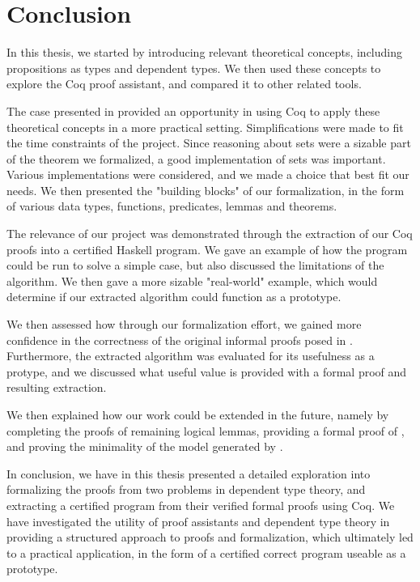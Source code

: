 \chapter{Conclusion}

In this thesis, we started by introducing relevant theoretical concepts,
including propositions as types and dependent types.
We then used these concepts to explore the Coq proof assistant,
and compared it to other related tools.

The case presented in 
provided an opportunity in using Coq to apply these theoretical concepts
in a more practical setting.
Simplifications were made to fit the time constraints of the project.
Since reasoning about sets were a sizable part of the theorem we formalized,
a good implementation of sets was important.
Various implementations were considered, and we made a choice that best fit our needs.
We then presented the "building blocks" of our formalization,
in the form of various data types, functions, predicates, lemmas and theorems.

The relevance of our project was demonstrated through the extraction
of our Coq proofs into a certified Haskell program.
We gave an example of how the program could be run to solve a simple case,
but also discussed the limitations of the algorithm.
We then gave a more sizable "real-world" example,
which would determine if our extracted algorithm could function as a prototype.

We then assessed how through our formalization effort,
we gained more confidence in the correctness of the original informal proofs posed in \cite{mbezem}.
Furthermore, the extracted algorithm was evaluated for its usefulness as a protype,
and we discussed what useful value is provided with a formal proof and resulting extraction.

We then explained how our work could be extended in the future,
namely by completing the proofs of remaining logical lemmas,
providing a formal proof of , and proving the minimality of the model generated by .

In conclusion, we have in this thesis presented a detailed exploration into formalizing
the proofs from two problems in dependent type theory,
and extracting a certified program from their verified formal proofs using Coq.
We have investigated the utility of proof assistants and dependent type theory
in providing a structured approach to proofs and formalization,
which ultimately led to a practical application,
in the form of a certified correct program useable as a prototype.
